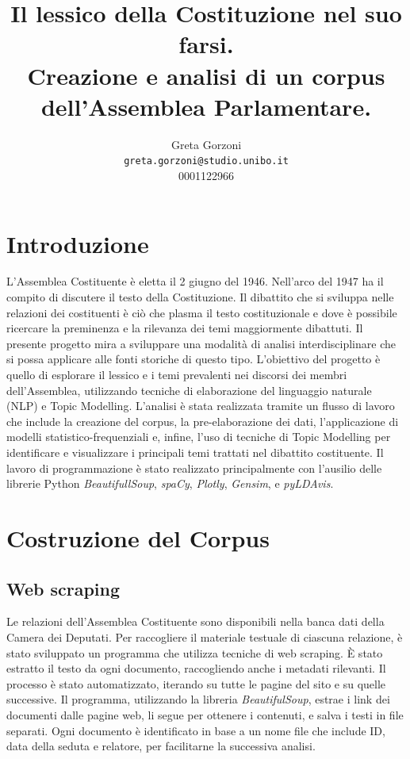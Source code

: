 \documentclass[11pt,twocolumn]{article}
\title{{\textbf{Il lessico della Costituzione nel suo farsi. \\ 
Creazione e analisi di un corpus dell'Assemblea Parlamentare}}.}
\author{
  Greta Gorzoni \\
  \texttt{greta.gorzoni@studio.unibo.it}  \\
  0001122966 }
\date{}
\begin{document}
\maketitle

\section{Introduzione}
L'Assemblea Costituente è eletta il 2 giugno del 1946. Nell'arco del 1947 ha il compito di discutere il testo della Costituzione. Il dibattito che si sviluppa nelle relazioni dei costituenti è ciò che plasma il testo costituzionale e dove è possibile ricercare la preminenza e la rilevanza dei temi maggiormente dibattuti.
Il presente progetto mira a sviluppare una modalità di analisi interdisciplinare che si possa applicare alle fonti storiche di questo tipo. L'obiettivo del progetto è quello di esplorare il lessico e i temi prevalenti nei discorsi dei membri dell'Assemblea, utilizzando tecniche di elaborazione del linguaggio naturale (NLP) e Topic Modelling. L'analisi è stata realizzata tramite un flusso di lavoro che include la creazione del corpus, la pre-elaborazione dei dati, l'applicazione di modelli statistico-frequenziali e, infine, l'uso di tecniche di Topic Modelling per identificare e visualizzare i principali temi trattati nel dibattito costituente. Il lavoro di programmazione è stato realizzato principalmente con l'ausilio delle librerie Python \textit{BeautifullSoup}, \textit{spaCy}, \textit{Plotly}, \textit{Gensim}, e \textit{pyLDAvis}.

\section{Costruzione del Corpus}
\subsection {Web scraping}
Le relazioni dell'Assemblea Costituente sono disponibili nella banca dati della Camera dei Deputati. 
Per raccogliere il materiale testuale di ciascuna relazione, è stato sviluppato un programma che utilizza tecniche di web scraping. È stato estratto il testo da ogni documento, raccogliendo anche i metadati rilevanti. Il processo è stato automatizzato, iterando su tutte le pagine del sito e su quelle successive. Il programma, utilizzando la libreria \textit{BeautifulSoup}, estrae i link dei documenti dalle pagine web, li segue per ottenere i contenuti, e salva i testi in file separati. Ogni documento è identificato in base a un nome file che include ID, data della seduta e relatore, per facilitarne la successiva analisi.
\end{document}
